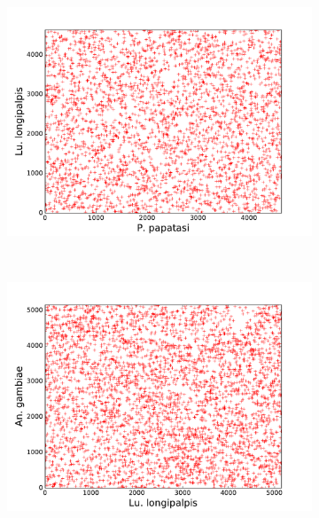 \begin{figure}[H]
  \centering
  \caption{QUALITATIVE ANALYSIS OF MACROSYNTENY}
  \begin{subfigure}[b]{0.4\textwidth}
    \includegraphics[width=\textwidth]{figures/synteny/papatasi_longipalpis_plot}
    \caption{\label{fig:synteny-dotplots-sandflies}}
  \end{subfigure}
  \\
  \begin{subfigure}[b]{0.4\textwidth}
    \includegraphics[width=\textwidth]{figures/synteny/longipalpis_anopheles_plot}
    \caption{\label{fig:synteny-dotplots-longipalpis-anopheles}}
  \end{subfigure}
  ~
  \begin{subfigure}[b]{0.4\textwidth}

\end{subfigure}
\end{figure}
